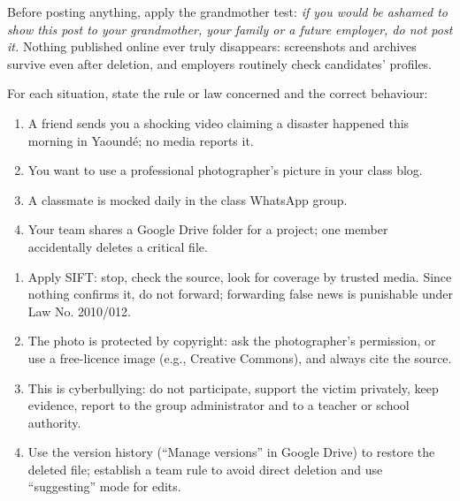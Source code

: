 \documentclass[11pt]{article}
\newcommand{\cle}[1]{{\popxbold\color{popdark}#1}}
\begin{document}
\begin{propriete}
Before posting anything, apply the \cle{grandmother test}: \emph{if you would be ashamed to show this post to your grandmother, your family or a future employer, do not post it.} Nothing published online ever truly disappears: screenshots and archives survive even after deletion, and employers routinely check candidates' profiles.
\end{propriete}

\begin{exercice}
For each situation, state the rule or law concerned and the correct behaviour:
\begin{enumerate}
\item A friend sends you a shocking video claiming a disaster happened this morning in Yaound\'e; no media reports it.
\item You want to use a professional photographer's picture in your class blog.
\item A classmate is mocked daily in the class WhatsApp group.
\item Your team shares a Google Drive folder for a project; one member accidentally deletes a critical file.
\end{enumerate}
\end{exercice}

\begin{corrige}[Exercise 1]
\begin{enumerate}
\item Apply SIFT: stop, check the source, look for coverage by trusted media. Since nothing confirms it, do not forward; forwarding false news is punishable under Law No. 2010/012.
\item The photo is protected by copyright: ask the photographer's permission, or use a free-licence image (e.g., Creative Commons), and always cite the source.
\item This is cyberbullying: do not participate, support the victim privately, keep evidence, report to the group administrator and to a teacher or school authority.
\item Use the version history (``Manage versions'' in Google Drive) to restore the deleted file; establish a team rule to avoid direct deletion and use ``suggesting'' mode for edits.
\end{enumerate}
\end{corrige}
\end{document}
